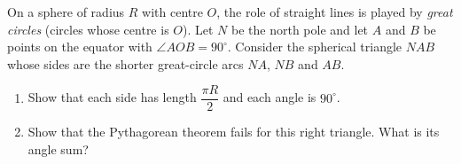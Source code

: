 On a sphere of radius $R$ with centre $O$, the role of straight lines is played by \emph{great circles} (circles whose centre is $O$). Let $N$ be the north pole and let $A$ and $B$ be points on the equator with $\angle AOB=90^\circ$. Consider the spherical triangle $NAB$ whose sides are the shorter great-circle arcs $NA$, $NB$ and $AB$.
\begin{enumerate}
\item[(a)] Show that each side has length $\dfrac{\pi R}{2}$ and each angle is $90^\circ$.
\item[(b)] Show that the Pythagorean theorem fails for this right triangle. What is its angle sum?
\end{enumerate}
